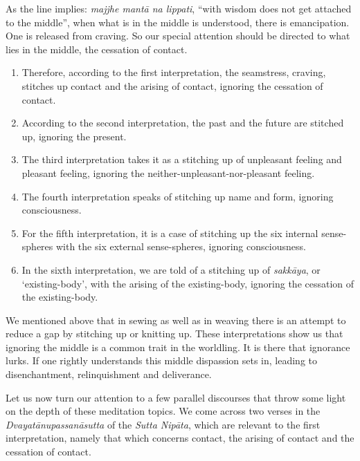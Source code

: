 As the line implies: \emph{majjhe mantā na lippati}, ``with wisdom does not get attached to the middle'', when what is in the middle is understood, there is emancipation. One is released from craving. So our special attention should be directed to what lies in the middle, the cessation of contact.

\begin{enumerate}
\def\labelenumi{\arabic{enumi}.}
\item
  Therefore, according to the first interpretation, the seamstress, craving, stitches up contact and the arising of contact, ignoring the cessation of contact.
\item
  According to the second interpretation, the past and the future are stitched up, ignoring the present.
\item
  The third interpretation takes it as a stitching up of unpleasant feeling and pleasant feeling, ignoring the neither-unpleasant-nor-pleasant feeling.
\item
  The fourth interpretation speaks of stitching up name and form, ignoring consciousness.
\item
  For the fifth interpretation, it is a case of stitching up the six internal sense-spheres with the six external sense-spheres, ignoring consciousness.
\item
  In the sixth interpretation, we are told of a stitching up of \emph{sakkāya}, or `existing-body', with the arising of the existing-body, ignoring the cessation of the existing-body.
\end{enumerate}

We mentioned above that in sewing as well as in weaving there is an attempt to reduce a gap by stitching up or knitting up. These interpretations show us that ignoring the middle is a common trait in the worldling. It is there that ignorance lurks. If one rightly understands this middle dispassion sets in, leading to disenchantment, relinquishment and deliverance.

Let us now turn our attention to a few parallel discourses that throw some light on the depth of these meditation topics. We come across two verses in the \emph{Dvayatānupassanāsutta} of the \emph{Sutta Nipāta}, which are relevant to the first interpretation, namely that which concerns contact, the arising of contact and the cessation of contact.

